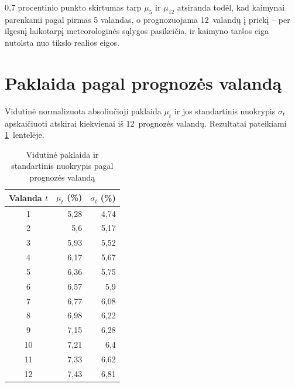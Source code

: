 \documentclass[]{VUMIFTemplateClass}
\begin{document}
    0,7 procentinio punkto skirtumas tarp $\mu_5$ ir $\mu_{12}$ atsiranda todėl, kad kaimynai parenkami pagal pirmas 5 valandas, o prognozuojama 12~valandų į priekį -- per ilgesnį laikotarpį meteorologinės sąlygos pasikeičia, ir kaimyno taršos eiga nutolsta nuo tikslo realios eigos.


    \section{Paklaida pagal prognozės valandą}

    Vidutinė normalizuota absoliučioji paklaida $\mu_t$ ir jos standartinis nuokrypis $\sigma_t$ apskaičiuoti atskirai kiekvienai iš 12~prognozės valandų.
    Rezultatai pateikiami \ref{tab:perhour}~lentelėje.

    \begin{table}[H]
        \centering
        \caption{Vidutinė paklaida ir standartinis nuokrypis pagal prognozės valandą}
        \small
        \setlength{\tabcolsep}{10pt}
        \begin{tabular}{|c|r|r|}
            \hline
            \textbf{Valanda $t$} & \textbf{$\mu_t$ (\%)} & \textbf{$\sigma_t$ (\%)} \\
            \hline
            1                    & 5{,}28                & 4{,}74                   \\
            2                    & 5{,}6                 & 5{,}17                   \\
            3                    & 5{,}93                & 5{,}52                   \\
            4                    & 6{,}17                & 5{,}67                   \\
            5                    & 6{,}36                & 5{,}75                   \\
            6                    & 6{,}57                & 5{,}9                    \\
            7                    & 6{,}77                & 6{,}08                   \\
            8                    & 6{,}98                & 6{,}22                   \\
            9                    & 7{,}15                & 6{,}28                   \\
            10                   & 7{,}21                & 6{,}4                    \\
            11                   & 7{,}33                & 6{,}62                   \\
            12                   & 7{,}43                & 6{,}81                   \\
            \hline
        \end{tabular}
        \label{tab:perhour}
    \end{table}
\end{document}
